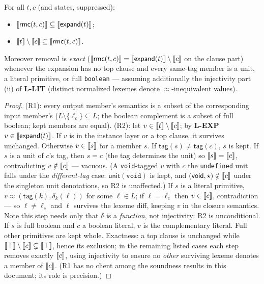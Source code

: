 \documentclass[11pt]{article}
\newcommand{\tagfn}{\mathsf{tag}}
\begin{document}
\begin{theorem}
\label{thm:rmc}
For all $t, c$ (and states, suppressed):
\begin{itemize}
\item[(R1)] $\llbracket \mathsf{rmc}(t,c) \rrbracket \subseteq \llbracket \mathsf{expand}(t) \rrbracket$;
\item[(R2)] $\llbracket t \rrbracket \setminus \llbracket c \rrbracket \subseteq \llbracket \mathsf{rmc}(t,c) \rrbracket$.
\end{itemize}
Moreover removal is \emph{exact}
($\llbracket \mathsf{rmc}(t,c) \rrbracket = \llbracket \mathsf{expand}(t) \rrbracket \setminus \llbracket c \rrbracket$
on the clause part) whenever the expansion has no top clause and every
same-tag member is a unit, a literal primitive, or full \texttt{boolean} —
assuming additionally the injectivity part (ii) of \textbf{L-LIT}
(distinct normalized lexemes denote $\approx$-inequivalent values).
\end{theorem}
\begin{proof}
(R1): every output member's semantics is a subset of the corresponding input
member's ($L \setminus \{\ell_c\} \subseteq L$; the boolean complement is a
subset of full boolean; kept members are equal).
(R2): let $v \in \llbracket t \rrbracket \setminus \llbracket c \rrbracket$; by \textbf{L-EXP}
$v \in \llbracket \mathsf{expand}(t) \rrbracket$. If $v$ is in the instance layer or a top
clause, it survives unchanged. Otherwise $v \in \llbracket s \rrbracket$ for a member $s$.
If $\tagfn(s) \neq \tagfn(c)$, $s$ is kept. If $s$ is a unit of $c$'s tag,
then $s = c$ (the tag determines the unit) so $\llbracket s \rrbracket = \llbracket c \rrbracket$,
contradicting $v \notin \llbracket c \rrbracket$ — vacuous. (A \texttt{void}-tagged $v$
with $c$ the \texttt{undefined} unit falls under the \emph{different-tag}
case: $\mathsf{unit}(\texttt{void})$ is kept, and
$(\mathsf{void},\star) \notin \llbracket c \rrbracket$ under the singleton unit
denotations, so R2 is unaffected.) If $s$ is a literal primitive,
$v \approx (\tagfn(k), \delta_k(\ell))$ for some $\ell \in L$; if
$\ell = \ell_c$ then $v \in \llbracket c \rrbracket$, contradiction — so $\ell \neq \ell_c$
and $\ell$ survives the lexeme diff, keeping $v$ in the closure semantics.
Note this step needs only that $\delta$ is a \emph{function}, not
injectivity: R2 is unconditional. If $s$ is full boolean and $c$ a boolean
literal, $v$ is the complementary literal. Full other primitives are kept
whole. Exactness: a top clause is unchanged while
$\llbracket \top \rrbracket \setminus \llbracket c \rrbracket \subsetneq \llbracket \top \rrbracket$, hence its exclusion;
in the remaining listed cases each step removes exactly $\llbracket c \rrbracket$, using
injectivity to ensure no \emph{other} surviving lexeme denotes a member of
$\llbracket c \rrbracket$. (R1 has no client among the soundness results in this document;
its role is precision.)
\end{proof}
\end{document}
